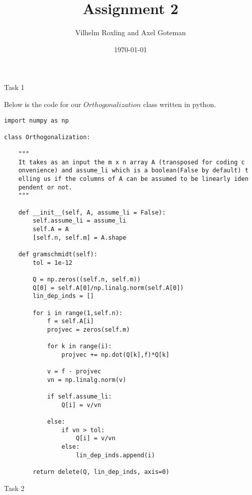 \documentclass[a4paper]{article}
\title{Assignment 2}
\author{Vilhelm Roxling and Axel Goteman}
\date{\today}
\begin{document}
\maketitle
\begin{description}

\item{Task 1}

Below is the code for our $Orthogonalization$ class written in python.

\begin{lstlisting}
import numpy as np

class Orthogonalization:

    """
    It takes as an input the m x n array A (transposed for coding c
    onvenience) and assume_li which is a boolean(False by default) t
    elling us if the columns of A can be assumed to be linearly iden
    pendent or not.
    """

    def __init__(self, A, assume_li = False):
        self.assume_li = assume_li
        self.A = A
        [self.n, self.m] = A.shape

    def gramschmidt(self):
        tol = 1e-12
        
        Q = np.zeros((self.n, self.m))
        Q[0] = self.A[0]/np.linalg.norm(self.A[0])
        lin_dep_inds = []

        for i in range(1,self.n):
            f = self.A[i]
            projvec = zeros(self.m)

            for k in range(i):
                projvec += np.dot(Q[k],f)*Q[k]        
        
            v = f - projvec
            vn = np.linalg.norm(v)

            if self.assume_li:
                Q[i] = v/vn

            else:
                if vn > tol:
                    Q[i] = v/vn
                else:
                    lin_dep_inds.append(i)
        
        return delete(Q, lin_dep_inds, axis=0)

\end{lstlisting}

\item{Task 2}


\end{description}
\end{document}
